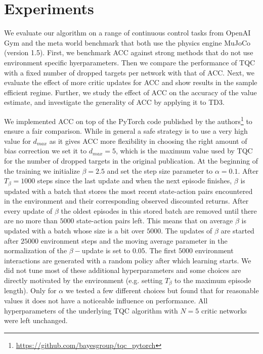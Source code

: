 \section{Experiments}


We evaluate our algorithm on a range of continuous control tasks from OpenAI Gym \cite{gymopenai} and the meta world benchmark \cite{yu2020meta} that both use  the physics engine MuJoCo \cite{mujoco} (version 1.5). 
First, we benchmark ACC against strong methods that do not use environment specific hyerparameters.
Then we compare the performance of TQC with a fixed number of dropped targets per network with that of ACC.
Next, we evaluate the effect of more critic updates for ACC and show results in the sample efficient regime.
Further, we study the effect of ACC on the accuracy of the value estimate, and investigate the generality of ACC by applying it to TD3.







We implemented ACC on top of the PyTorch code published by the authors\footnote{\url{https://github.com/bayesgroup/tqc_pytorch}} to ensure a fair comparison.
While in general a safe strategy is to use a very high value for $d_{max}$ as it gives ACC more flexibility in choosing the right amount of bias correction we set it to $d_{max}=5$, which is the maximum value used by TQC for the number of dropped targets in the original publication.
At the beginning of the training we initialize $\beta = 2.5$ and set the step size parameter to $\alpha=0.1$.
After $T_\beta = 1000$ steps since the last update and when the next episode finishes, $\beta$ is updated with a batch that stores the most recent state-action pairs encountered in the environment and their corresponding observed discounted returns. 
After every update of $\beta$ the oldest episodes in this stored batch are removed until there are no more than $5000$ state-action pairs left.
This means that on average $\beta$ is updated with a batch whose size is a bit over $5000$. 
The updates of $\beta$ are started after $25000$ environment steps and
the moving average parameter in the normalization of the $\beta-$update is set to $0.05$. 
The  first $5000$ environment interactions are generated with a random policy after which learning starts.
We did not tune most of these additional hyperparameters and some choices are directly motivated by the environment (e.g. setting $T_\beta$ to the maximum episode length). Only for $\alpha$ we tested a few different choices but found that for reasonable values it does not have a noticeable influence on performance. 
All hyperparameters of the underlying TQC algorithm  with $N=5$ critic networks were left unchanged.




